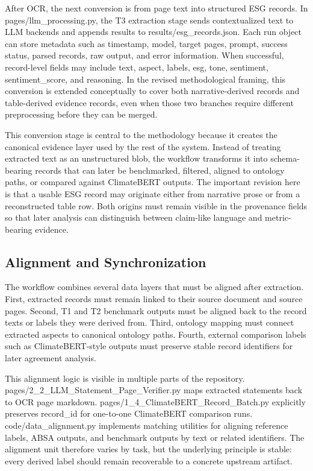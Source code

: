 After OCR, the next conversion is from page text into structured ESG records. In pages/llm\_processing.py, the T3 extraction stage sends contextualized text to LLM backends and appends results to results/esg\_records.json. Each run object can store metadata such as timestamp, model, target pages, prompt, success status, parsed records, raw output, and error information. When successful, record-level fields may include text, aspect, labels, esg, tone, sentiment, sentiment\_score, and reasoning. In the revised methodological framing, this conversion is extended conceptually to cover both narrative-derived records and table-derived evidence records, even when those two branches require different preprocessing before they can be merged.

This conversion stage is central to the methodology because it creates the canonical evidence layer used by the rest of the system. Instead of treating extracted text as an unstructured blob, the workflow transforms it into schema-bearing records that can later be benchmarked, filtered, aligned to ontology paths, or compared against ClimateBERT outputs. The important revision here is that a usable ESG record may originate either from narrative prose or from a reconstructed table row. Both origins must remain visible in the provenance fields so that later analysis can distinguish between claim-like language and metric-bearing evidence.

\subsection{Alignment and Synchronization}

The workflow combines several data layers that must be aligned after extraction. First, extracted records must remain linked to their source document and source pages. Second, T1 and T2 benchmark outputs must be aligned back to the record texts or labels they were derived from. Third, ontology mapping must connect extracted aspects to canonical ontology paths. Fourth, external comparison labels such as ClimateBERT-style outputs must preserve stable record identifiers for later agreement analysis.

This alignment logic is visible in multiple parts of the repository. pages/2\_2\_LLM\_Statement\_Page\_Verifier.py maps extracted statements back to OCR page markdown. pages/1\_4\_ClimateBERT\_Record\_Batch.py explicitly preserves record\_id for one-to-one ClimateBERT comparison runs. code/data\_alignment.py implements matching utilities for aligning reference labels, ABSA outputs, and benchmark outputs by text or related identifiers. The alignment unit therefore varies by task, but the underlying principle is stable: every derived label should remain recoverable to a concrete upstream artifact.

